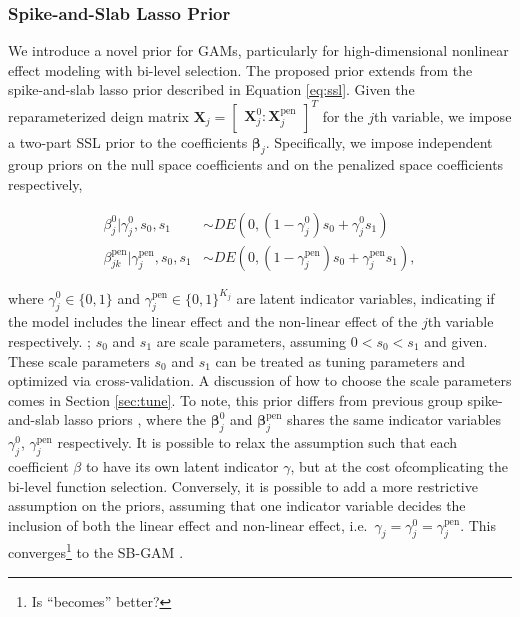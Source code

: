 \documentclass[AMA,STIX1COL,]{WileyNJD-v2}
\begin{document}
\hypertarget{spike-and-slab-lasso-prior}{%
\subsubsection{Spike-and-Slab Lasso
Prior}\label{spike-and-slab-lasso-prior}}

We introduce a novel prior for GAMs, particularly for high-dimensional
nonlinear effect modeling with bi-level selection. The proposed prior
extends from the spike-and-slab lasso prior described in Equation
\ref{eq:ssl}. Given the reparameterized deign matrix
\(\boldsymbol{X}_j = \begin{bmatrix} \boldsymbol{X}_j^0 : \boldsymbol{X}_j^\text{pen}\end{bmatrix}^T\)
for the \(j\)th variable, we impose a two-part SSL prior to the
coefficients \(\boldsymbol{\beta}_j\). Specifically, we impose
independent group priors on the null space coefficients and on the
penalized space coefficients respectively,

\begin{align}\label{eq:bham_ssl}
  \beta^0_{j} |\gamma^0_{j},s_0,s_1 &\sim DE(0,(1-\gamma^0_{j}) s_0 + \gamma^0_{j} s_1)\\
  \beta^\text{pen}_{jk} | \gamma^\text{pen}_{j},s_0,s_1 &\sim DE(0,(1-\gamma^\text{pen}_{j}) s_0 + \gamma^\text{pen}_{j} s_1), 
\end{align}

where \(\gamma^0_{j}\in\{0,1\}\) and
\(\gamma^\text{pen}_{j}\in \{0,1\}^{K_j}\) are latent indicator
variables, indicating if the model includes the linear effect and the
non-linear effect of the \(j\)th variable respectively. ; \(s_0\) and
\(s_1\) are scale parameters, assuming \(0 < s_0 < s_1\) and given.
These scale parameters \(s_0\) and \(s_1\) can be treated as tuning
parameters and optimized via cross-validation. A discussion of how to
choose the scale parameters comes in Section \ref{sec:tune}. To note,
this prior differs from previous group spike-and-slab lasso priors
\citep{Tang2018, Tang2019}, where the \(\boldsymbol{\beta}^0_j\) and
\(\boldsymbol{\beta}^\text{pen}_j\) shares the same indicator variables
\(\gamma_j^0\), \(\gamma_j^\text{pen}\) respectively. It is possible to
relax the assumption such that each coefficient \(\beta\) to have its
own latent indicator \(\gamma\), but at the cost ofcomplicating the
bi-level function selection. Conversely, it is possible to add a more
restrictive assumption on the priors, assuming that one indicator
variable decides the inclusion of both the linear effect and non-linear
effect, i.e.~\(\gamma_j = \gamma^0_j = \gamma^\text{pen}_j\). This
converges\footnote{Is ``becomes'' better?} to the SB-GAM
\citep{Bai2021}.
\end{document}
